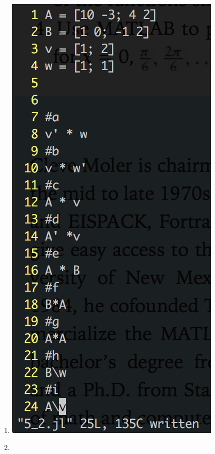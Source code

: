 \documentclass[]{article}
\begin{document}
\begin{enumerate}
\def\labelenumi{\arabic{enumi}.}
\item
  \includegraphics{5_1}
\item

\end{enumerate}
\end{document}

